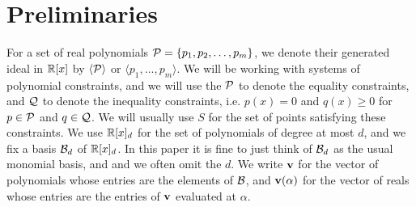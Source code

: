 \section{Preliminaries}
\label{sec:prelims}
For a set of real polynomials $\mathcal P = \{p_1, p_2, \dots, p_m\}$, we denote their generated ideal in $\mathbb R[x]$ by $\langle \mathcal P\rangle$ or $\langle p_1, \dots, p_m\rangle$. We will be working with systems of polynomial constraints, and we will use the $\mathcal P$ to denote the equality constraints, and $\mathcal Q$ to denote the inequality constraints, i.e. $p(x) = 0$ and $q(x) \geq 0$ for $p \in \mathcal P$ and $q \in \mathcal Q$. We will usually use $S$ for the set of points satisfying these constraints. We use $\mathbb R[x]_d$ for the set of polynomials of degree at most $d$, and we fix a basis $\mathcal B_d$ of $\mathbb R[x]_d$. In this paper it is fine to just think of $\mathcal B_d$ as the usual monomial basis, and and we often omit the $d$. We write ${\bf v}$ for the vector of polynomials whose entries are the elements of $\mathcal B$, and ${\bf v}(\alpha)$ for the vector of reals whose entries are the entries of ${\bf v}$ evaluated at $\alpha$. 

